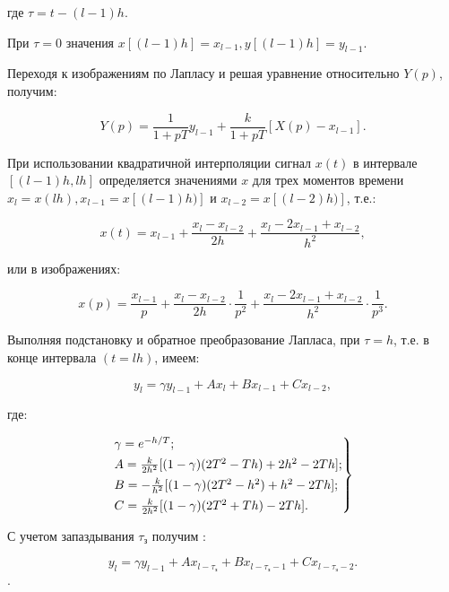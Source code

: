 где $\tau = t - (l - 1)h$.

При $\tau = 0$ значения $x[(l - 1)h] = x_{l - 1}, y[(l - 1)h] = y_{l - 1}$.

Переходя к изображениям по Лапласу и решая уравнение относительно $Y(p)$, получим:

\begin{equation}
    Y(p) = \frac{1}{1 + pT}y_{l - 1}+\frac{k}{1 + pT}[X(p) - x_{l - 1}].
\end{equation}

При использовании квадратичной интерполяции сигнал $x(t)$ в интервале $[(l - 1)h, lh]$ определяется значениями $x$ для трех моментов времени $x_l = x(lh), x_{l - 1} = x[(l - 1)h)]$ и $x_{l - 2} = x[(l - 2)h)]$, т.е.:

\begin{equation}
    x(t) = x_{l - 1} + \frac{x_l - x_{l - 2}}{2h} + \frac{x_l - 2x_{l - 1}+ x_{l - 2}}{h^2},
\end{equation}

или в изображениях:

\begin{equation}
    x(p) = \frac{x_{l - 1}}{p} + \frac{x_l - x_{l - 2}}{2h}\cdot\frac{1}{p^2} + \frac{x_l - 2x_{l - 1} + x_{l - 2}}{h^2}\cdot\frac{1}{p^3}.
\end{equation}

Выполняя подстановку и обратное преобразование Лапласа, при $\tau = h$, т.е. в конце интервала $(t = lh)$, имеем:

\begin{equation}
    y_l = \gamma y_{l - 1} + Ax_l + Bx_{l - 1} + Cx_{l - 2},
\end{equation}

где:

\begin{equation}
    \begin{rcases}
        \gamma = e^{-h/T};\\
        A = \frac{k}{2h^2}[(1 - \gamma)(2T^2 - Th) + 2h^2 - 2Th];\\
        B = -\frac{k}{h^2}[(1 - \gamma)(2T^2 - h^2) + h^2 - 2Th];\\
        C = \frac{k}{2h^2}[(1 - \gamma)(2T^2 + Th) - 2Th].
    \end{rcases}
\end{equation}

С учетом запаздывания $\tau_\text{з}$ получим \cite{Нетушил1978}:

\begin{equation}
    y_l = \gamma y_{l - 1} + Ax_{l - \tau_\text{з}} + Bx_{l - \tau_\text{з} - 1} + Cx_{l - \tau_\text{з} - 2}.
\end{equation}.

